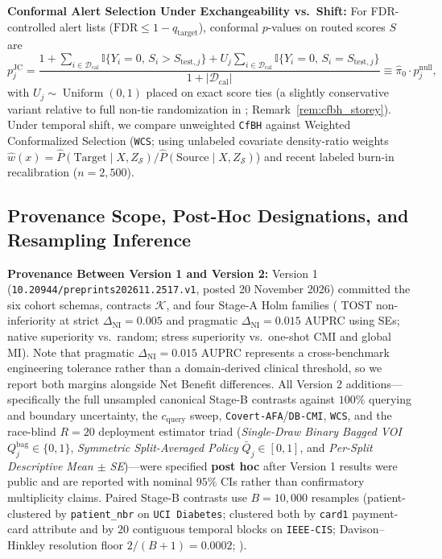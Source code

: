 \documentclass[11pt]{article}
\theoremstyle{remark}
\begin{document}
\textbf{Conformal Alert Selection Under Exchangeability vs.\ Shift:} For FDR-controlled alert lists ($\text{FDR} \le 1 - q_{\text{target}}$), \citet{jin2023selection} conformal $p$-values on routed scores $S$ are
\begin{equation}
  p_j^{\text{JC}} = \frac{1 + \sum_{i \in \mathcal{D}_{\text{cal}}} \mathbb{I}\{Y_i = 0,\, S_i > S_{\text{test},j}\} + U_j \sum_{i \in \mathcal{D}_{\text{cal}}} \mathbb{I}\{Y_i = 0,\, S_i = S_{\text{test},j}\}}{1 + |\mathcal{D}_{\text{cal}}|}
  \equiv \hat{\pi}_0 \cdot p_j^{\text{null}},
  \label{eq:cfbh}
\end{equation}
with $U_j \sim \operatorname{Uniform}(0,1)$ placed on exact score ties (a slightly conservative variant relative to full non-tie randomization in \citealp{jin2023selection}; Remark~\ref{rem:cfbh_storey}). Under temporal shift, we compare unweighted \texttt{CfBH} against \citet{jin2025wcs} Weighted Conformalized Selection (\texttt{WCS}; using unlabeled covariate density-ratio weights $\hat{w}(x) = \hat{P}(\text{Target}\mid X, Z_{\mathcal{S}}) / \hat{P}(\text{Source}\mid X, Z_{\mathcal{S}})$) and recent labeled burn-in recalibration ($n = 2{,}500$).

\subsection{Provenance Scope, Post-Hoc Designations, and Resampling Inference}
\label{sec:inference}

\textbf{Provenance Between Version 1 and Version 2:} Version 1 (\texttt{10.20944/preprints202611.2517.v1}, posted 20 November 2026) committed the six cohort schemas, contracts $\mathcal{K}$, and four Stage-A Holm families (\citealp{schuirmann1987comparison} TOST non-inferiority at strict $\Delta_{\text{NI}}=0.005$ and pragmatic $\Delta_{\text{NI}}=0.015$ AUPRC using \citealp{nadeau2003inference} SEs; native superiority vs.\ random; stress superiority vs.\ one-shot CMI and global MI). Note that pragmatic $\Delta_{\text{NI}}=0.015$ AUPRC represents a cross-benchmark engineering tolerance rather than a domain-derived clinical threshold, so we report both margins alongside Net Benefit differences. All Version 2 additions---specifically the full unsampled canonical Stage-B contrasts against $100\%$ querying and boundary uncertainty, the $c_{\text{query}}$ sweep, \texttt{Covert-AFA}/\texttt{DB-CMI}, \texttt{WCS}, and the race-blind $R = 20$ deployment estimator triad (\emph{Single-Draw Binary Bagged VOI} $Q_j^{\text{bag}} \in \{0,1\}$, \emph{Symmetric Split-Averaged Policy} $\bar{Q}_j \in [0,1]$, and \emph{Per-Split Descriptive Mean $\pm$ SE})---were specified \textbf{post hoc} after Version 1 results were public and are reported with nominal $95\%$ CIs rather than confirmatory multiplicity claims. Paired Stage-B contrasts use $B = 10{,}000$ resamples (patient-clustered by \texttt{patient\_nbr} on \texttt{UCI Diabetes}; clustered both by \texttt{card1} payment-card attribute and by $20$ contiguous temporal blocks on \texttt{IEEE-CIS}; Davison--Hinkley resolution floor $2/(B+1) = 0.0002$; \citealp{davison1997bootstrap}).
\end{document}
